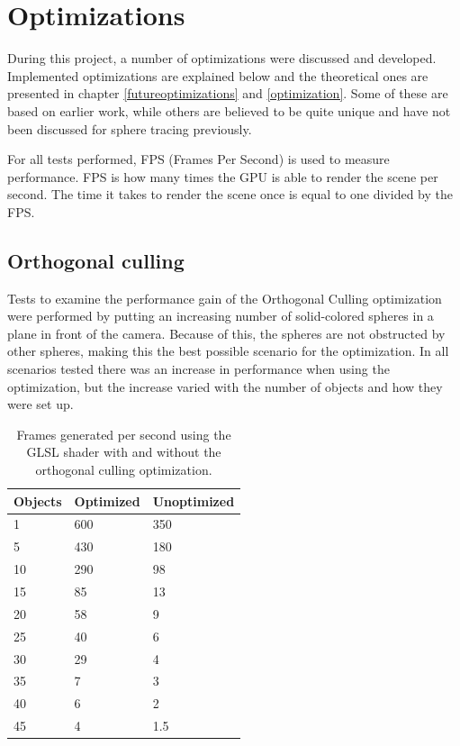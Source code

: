 	\section{Optimizations}
		
		During this project, a number of optimizations were discussed and
		developed. Implemented optimizations are explained below and the
		theoretical ones are presented in chapter \ref{futureoptimizations} and
		\ref{optimization}. Some of these are based on earlier work, while
		others are believed to be quite unique and have not been
		discussed for sphere tracing previously. 

		For all tests performed, FPS (Frames Per Second) is used to measure
		performance. FPS is how many times the GPU is able to render 
		the scene per second. The time it takes to render the scene once is 
		equal to one divided by the FPS.

		\subsection{Orthogonal culling}
		
		Tests to examine the performance gain of the Orthogonal Culling optimization
		were performed by putting an increasing number of solid-colored spheres
		in a plane in front of the camera. Because of this, the spheres are not
		obstructed by other spheres, making this the best possible scenario for
		the optimization. In all scenarios tested there was an increase in 
		performance when using the optimization, but the increase varied with the 
		number of objects and how they were set up.

			\begin{table}
			\centering
			\begin{tabular}{lll}
				\hline
				Objects & Optimized & Unoptimized \\ 
				\hline
				1       & 600       & 350         \\ 
				5       & 430       & 180         \\			
				10      & 290       & 98          \\
				15      & 85        & 13          \\
				20      & 58        & 9           \\
				25      & 40        & 6           \\
				30      & 29        & 4           \\
				35      & 7         & 3           \\
				40      & 6         & 2           \\
				45      & 4         & 1.5         \\
				\hline
			\end{tabular}
			\caption{Frames generated per second using the GLSL shader with and
				without the orthogonal culling optimization.}
			\end{table}

